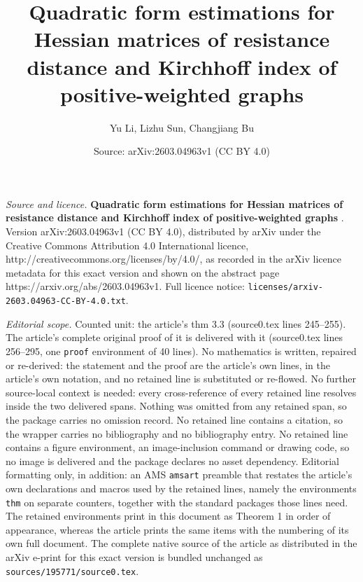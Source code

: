 \documentclass[10pt,a4paper]{amsart}
\title{\textbf{ Quadratic form estimations for Hessian matrices of resistance distance and Kirchhoff index of positive-weighted graphs }}
\author{Yu Li, Lizhu Sun, Changjiang Bu}
\date{Source: arXiv:2603.04963v1 (CC BY 4.0)}
\begin{document}
\maketitle

\noindent\emph{Source and licence.} \textbf{ Quadratic form estimations for Hessian matrices of resistance distance and Kirchhoff index of positive-weighted graphs }. Version arXiv:2603.04963v1 (CC BY 4.0), distributed by arXiv under the Creative Commons Attribution 4.0 International licence, http://creativecommons.org/licenses/by/4.0/, as recorded in the arXiv licence metadata for this exact version and shown on the abstract page https://arxiv.org/abs/2603.04963v1. Full licence notice: \texttt{licenses/arxiv-2603.04963-CC-BY-4.0.txt}.\par\smallskip

\noindent\textit{Editorial scope.} Counted unit: the article's thm 3.3 (source0.tex lines 245--255). The article's complete original proof of it is delivered with it (source0.tex lines 256--295, one \texttt{proof} environment of 40 lines). No mathematics is written, repaired or re-derived: the statement and the proof are the article's own lines, in the article's own notation, and no retained line is substituted or re-flowed.  No further source-local context is needed: every cross-reference of every retained line resolves inside the two delivered spans.  Nothing was omitted from any retained span, so the package carries no omission record.  No retained line contains a citation, so the wrapper carries no bibliography and no bibliography entry.  No retained line contains a figure environment, an image-inclusion command or drawing code, so no image is delivered and the package declares no asset dependency.  Editorial formatting only, in addition: an AMS \texttt{amsart} preamble that restates the article's own declarations and macros used by the retained lines, namely the environments \texttt{thm} on separate counters, together with the standard packages those lines need.  The retained environments print in this document as Theorem 1 in order of appearance, whereas the article prints the same items with the numbering of its own full document.  The complete native source of the article as distributed in the arXiv e-print for this exact version is bundled unchanged as \texttt{sources/195771/source0.tex}.
\end{document}
